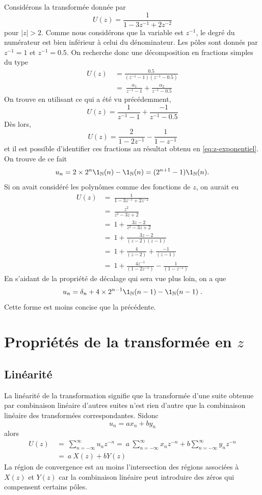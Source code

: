 \begin{example}
Consid\'{e}rons la transform\'{e}e donn\'{e}e par
$$
U(z)=\frac{1}{1-3z^{-1}+2z^{-2}}
$$
pour $|z|>2$. Comme nous consid\'{e}rons que la variable est $z^{-1}$, le degr\'{e} du num\'{e}rateur est bien inf\'{e}rieur \`{a} celui du d\'{e}nominateur.
Les p\^{o}les sont donn\'{e}s par $z^{-1}=1$ et $z^{-1}=0.5$. On recherche donc une d\'{e}composition en fractions simples du type
\begin{align*}
U(z)\ &= \frac{0.5}{(z^{-1}-1)(z^{-1}-0.5)} \\
      &=\ \frac{\alpha_{1}}{z^{-1}-1}+\frac{\alpha_{2}}{z^{-1}-0.5}
\end{align*}
On trouve en utilisant ce qui a \'{e}t\'{e} vu pr\'{e}c\'{e}demment,
$$
U(z)=\frac{1}{z^{-1}-1}+\frac{-1}{z^{-1}-0.5}
$$
D\`{e}s lors,
$$
U(z)=\frac{2}{1-2z^{-1}}-\frac{1}{1-z^{-1}}
$$
et il est possible d'identifier ces fractions au r\'{e}sultat obtenu en \eqref{eq:z-exponentiel}. On trouve de ce fait
$$
u_n=2\times 2^{n} \1_{\nset}(n) - \1_{\nset}(n)=(2^{n+1}-1) \1_{\nset}(n) .
$$
Si on avait consid\'{e}r\'{e} les polyn\^{o}mes comme des fonctions de $z$, on aurait eu
\begin{align*}
U(z) &=\ \frac{1}{1-3z^{-1}+2z^{-2}} \\
     &=\ \frac{z^{2}}{z^{2}-3z+2}\\
     &=\ 1+\frac{3z-2}{z^{2}-3z+2}\\
     &=\ 1+\frac{3z-2}{(z-2)(z-1)}\\
     &=\ 1+\frac{4}{(z-2)}+\frac{-1}{(z-1)}\\
     &=\ 1+\frac{4z^{-1}}{(1-2z^{-1})}-\frac{1}{(1-z^{-1})}
\end{align*}
En s'aidant de la propri\'{e}t\'{e} de d\'{e}calage qui sera vue plus loin, on a que
$$
u_n=\delta_n +4\times 2^{n-1} \1_{\nset}(n-1)-\1_{\nset}(n-1) \eqsp.
$$
Cette forme est moins concise que la pr\'{e}c\'{e}dente.
\end{example}
\section{Propri\'{e}t\'{e}s de la transform\'{e}e en $z$}
\subsection{Lin\'{e}arit\'{e}}
La lin\'{e}arit\'{e} de la transformation signifie que la transform\'{e}e d'une suite obtenue par combinaison lin\'{e}aire d'autres suites n'est rien d'autre que la combinaison lin\'{e}aire des transform\'{e}es correspondantes. Sidonc
$$
u_n=a x_n +b y_n
$$
alors
\begin{align*}
U(z)\ &=\ \sum_{n=-\infty}^{\infty} u_n z^{-n} =\ a\ \sum_{n=-\infty}^{\infty}x_{n} z^{-n}+b\sum_{n=-\infty}^{\infty} y_n z^{-n} \\
&=\ a\ X(z)+bY(z)
\end{align*}
La r\'{e}gion de convergence est au moins l'intersection des r\'{e}gions associ\'{e}es \`{a} $X(z)$ et $Y(z)$ car la combinaison lin\'{e}aire peut introduire des z\'{e}ros qui compensent certains p\^{o}les.

